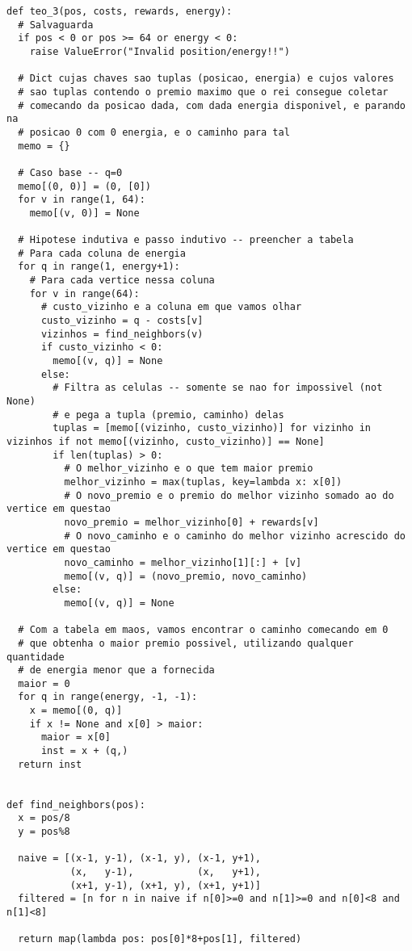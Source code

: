 \documentclass{article}
\begin{document}
{\color{blue}
\begin{verbatim}
def teo_3(pos, costs, rewards, energy):
  # Salvaguarda
  if pos < 0 or pos >= 64 or energy < 0:
    raise ValueError("Invalid position/energy!!")

  # Dict cujas chaves sao tuplas (posicao, energia) e cujos valores
  # sao tuplas contendo o premio maximo que o rei consegue coletar
  # comecando da posicao dada, com dada energia disponivel, e parando na
  # posicao 0 com 0 energia, e o caminho para tal
  memo = {}

  # Caso base -- q=0
  memo[(0, 0)] = (0, [0])
  for v in range(1, 64):
    memo[(v, 0)] = None

  # Hipotese indutiva e passo indutivo -- preencher a tabela
  # Para cada coluna de energia
  for q in range(1, energy+1):
    # Para cada vertice nessa coluna
    for v in range(64):
      # custo_vizinho e a coluna em que vamos olhar
      custo_vizinho = q - costs[v]
      vizinhos = find_neighbors(v)
      if custo_vizinho < 0:
        memo[(v, q)] = None
      else:
        # Filtra as celulas -- somente se nao for impossivel (not None)
        # e pega a tupla (premio, caminho) delas
        tuplas = [memo[(vizinho, custo_vizinho)] for vizinho in vizinhos if not memo[(vizinho, custo_vizinho)] == None]
        if len(tuplas) > 0:
          # O melhor_vizinho e o que tem maior premio
          melhor_vizinho = max(tuplas, key=lambda x: x[0])
          # O novo_premio e o premio do melhor vizinho somado ao do vertice em questao
          novo_premio = melhor_vizinho[0] + rewards[v]
          # O novo_caminho e o caminho do melhor vizinho acrescido do vertice em questao
          novo_caminho = melhor_vizinho[1][:] + [v]
          memo[(v, q)] = (novo_premio, novo_caminho)
        else:
          memo[(v, q)] = None

  # Com a tabela em maos, vamos encontrar o caminho comecando em 0
  # que obtenha o maior premio possivel, utilizando qualquer quantidade
  # de energia menor que a fornecida
  maior = 0
  for q in range(energy, -1, -1):
    x = memo[(0, q)]
    if x != None and x[0] > maior:
      maior = x[0]
      inst = x + (q,)
  return inst


def find_neighbors(pos):
  x = pos/8
  y = pos%8

  naive = [(x-1, y-1), (x-1, y), (x-1, y+1),
           (x,   y-1),           (x,   y+1),
           (x+1, y-1), (x+1, y), (x+1, y+1)]
  filtered = [n for n in naive if n[0]>=0 and n[1]>=0 and n[0]<8 and n[1]<8]

  return map(lambda pos: pos[0]*8+pos[1], filtered)
\end{verbatim}
}
\end{document}

